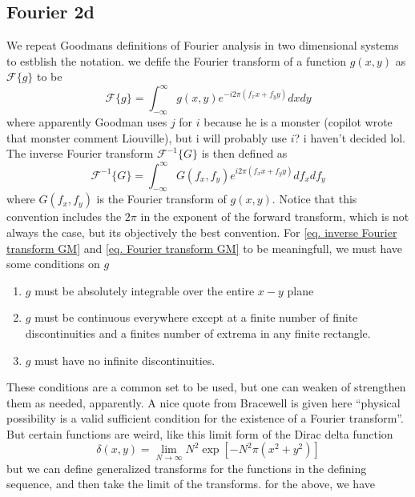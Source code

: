 \documentclass[../../main.tex]{subfiles}
\begin{document}
\subsection{Fourier 2d}
We repeat Goodmans definitions of Fourier analysis in two dimensional systems to estblish the notation. we defife the Fourier transform of a function $g(x,y)$ as
$\mathcal{F}\{g\}$ to be
\begin{equation}\label{eq. Fourier transform GM}
    \mathcal{F}\{g\}=\int_{-\infty}^{\infty}g(x,y)e^{-i2\pi(f_x x+f_yy)}dxdy
\end{equation}
where apparently Goodman uses $j$ for $i$ because he is a monster (copilot wrote that monster comment Liouville), but i will probably use $i$? i haven't decided lol. The inverse Fourier transform $\mathcal{F}^{-1}\{G\}$ is then defined as
\begin{equation}\label{eq. inverse Fourier transform GM}
    \mathcal{F}^{-1}\{G\}=\int_{-\infty}^{\infty}G(f_x,f_y)e^{i2\pi(f_x x+f_yy)}df_xdf_y
\end{equation}
where $G(f_x,f_y)$ is the Fourier transform of $g(x,y)$. Notice that this convention includes the $2\pi$ in the exponent of the forward transform, which is not always the case, but its objectively the best convention. For \ref{eq. inverse Fourier transform GM} and \ref{eq. Fourier transform GM} to be meaningfull, we must have some conditions on $g$
\begin{enumerate}
    \item $g$ must be absolutely integrable over the entire $x-y$ plane
    \item $g$ must be continuous everywhere except at a finite number of finite discontinuities and a finites number of extrema in any finite rectangle.
    \item $g$ must have no infinite discontinuities.
\end{enumerate}
These conditions are a common set to be used, but one can weaken of strengthen them as needed, apparently. A nice quote from Bracewell is given here ``physical possibility is a valid sufficient condition for the existence of a Fourier transform''. But certain functions are weird, like this limit form of the Dirac delta function
\begin{equation}\label{eq. dirac delta limit}
    \delta(x,y)=\lim_{N\to\infty}N^2\exp{\left[-N^2\pi(x^2+y^2)\right]}
\end{equation}
but we can define generalized transforms for the functions in the defining sequence, and then take the limit of the transforms. for the above, we have
\end{document}
